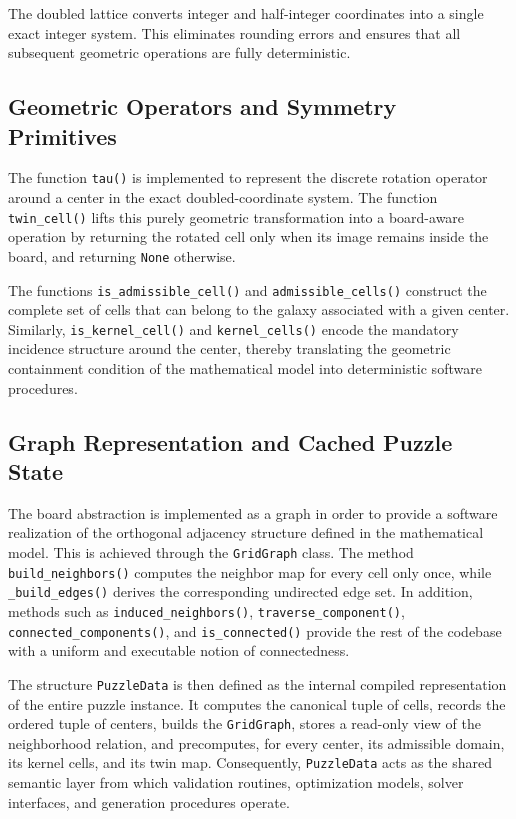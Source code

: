 The doubled lattice converts integer and half-integer coordinates into a single exact integer system. This eliminates rounding errors and ensures that all subsequent geometric operations are fully deterministic.

\subsection{Geometric Operators and Symmetry Primitives}

The function \texttt{tau()} is implemented to represent the discrete rotation operator around a center in the exact doubled-coordinate system. The function \texttt{twin\_cell()} lifts this purely geometric transformation into a board-aware operation by returning the rotated cell only when its image remains inside the board, and returning \texttt{None} otherwise.

The functions \texttt{is\_admissible\_cell()} and \texttt{admissible\_cells()} construct the complete set of cells that can belong to the galaxy associated with a given center. Similarly, \texttt{is\_kernel\_cell()} and \texttt{kernel\_cells()} encode the mandatory incidence structure around the center, thereby translating the geometric containment condition of the mathematical model into deterministic software procedures.

\subsection{Graph Representation and Cached Puzzle State}

The board abstraction is implemented as a graph in order to provide a software realization of the orthogonal adjacency structure defined in the mathematical model. This is achieved through the \texttt{GridGraph} class. The method \texttt{build\_neighbors()} computes the neighbor map for every cell only once, while \texttt{\_build\_edges()} derives the corresponding undirected edge set. In addition, methods such as \texttt{induced\_neighbors()}, \texttt{traverse\_component()}, \texttt{connected\_components()}, and \texttt{is\_connected()} provide the rest of the codebase with a uniform and executable notion of connectedness.

The structure \texttt{PuzzleData} is then defined as the internal compiled representation of the entire puzzle instance. It computes the canonical tuple of cells, records the ordered tuple of centers, builds the \texttt{GridGraph}, stores a read-only view of the neighborhood relation, and precomputes, for every center, its admissible domain, its kernel cells, and its twin map. Consequently, \texttt{PuzzleData} acts as the shared semantic layer from which validation routines, optimization models, solver interfaces, and generation procedures operate.

